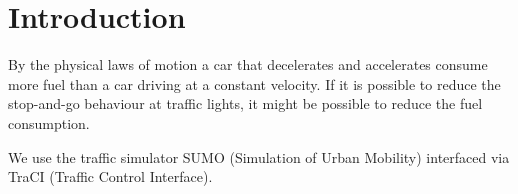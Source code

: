 \section{Introduction}
By the physical laws of motion a car that decelerates and accelerates consume more fuel than a car driving at a constant velocity. %
If it is possible to reduce the stop-and-go behaviour at traffic lights, it might be possible to reduce the fuel consumption.

We use the traffic simulator SUMO (Simulation of Urban Mobility)\cite{sumo} interfaced via TraCI (Traffic Control Interface)\cite{traci}.
